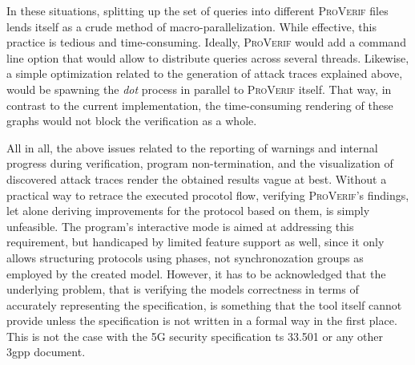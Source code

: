 In these situations, splitting up the set of queries into different \textsc{ProVerif} files lends itself as a crude method of macro-parallelization.
While effective, this practice is tedious and time-consuming.
Ideally, \textsc{ProVerif} would add a command line option that would allow to distribute queries across several threads.
Likewise, a simple optimization related to the generation of attack traces explained above, would be spawning the \textit{dot} process in parallel to \textsc{ProVerif} itself.
That way, in contrast to the current implementation, the time-consuming rendering of these graphs would not block the verification as a whole.\medskip

All in all, the above issues related to the reporting of warnings and internal progress during verification, program non-termination, and the visualization of discovered attack traces render the obtained results vague at best.
Without a practical way to retrace the executed procotol flow, verifying \textsc{ProVerif}'s findings, let alone deriving improvements for the protocol based on them, is simply unfeasible.
The program's interactive mode is aimed at addressing this requirement, but handicaped by limited feature support as well, since it only allows structuring protocols using phases, not synchronozation groups as employed by the created model.
However, it has to be acknowledged that the underlying problem, that is verifying the models correctness in terms of accurately representing the specification, is something that the tool itself cannot provide unless the specification is not written in a formal way in the first place.
This is not the case with the 5G security specification \gls{ts} 33.501 or any other \gls{3gpp} document.